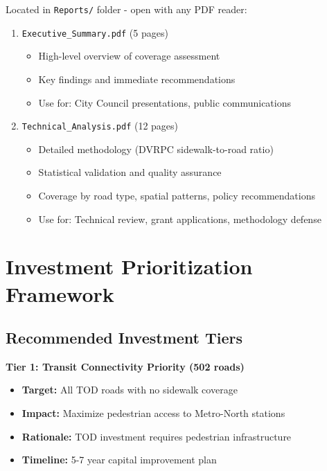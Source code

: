 \documentclass[11pt,letterpaper]{article}
\begin{document}
Located in \texttt{Reports/} folder - open with any PDF reader:

\begin{enumerate}[leftmargin=*]
    \item \texttt{Executive\_Summary.pdf} (5 pages)
    \begin{itemize}
        \item High-level overview of coverage assessment
        \item Key findings and immediate recommendations
        \item Use for: City Council presentations, public communications
    \end{itemize}

    \item \texttt{Technical\_Analysis.pdf} (12 pages)
    \begin{itemize}
        \item Detailed methodology (DVRPC sidewalk-to-road ratio)
        \item Statistical validation and quality assurance
        \item Coverage by road type, spatial patterns, policy recommendations
        \item Use for: Technical review, grant applications, methodology defense
    \end{itemize}
\end{enumerate}

\vspace{1em}

\section{Investment Prioritization Framework}

\subsection{Recommended Investment Tiers}

\textbf{Tier 1: Transit Connectivity Priority (502 roads)}
\begin{itemize}[leftmargin=*]
    \item \textbf{Target:} All TOD roads with no sidewalk coverage
    \item \textbf{Impact:} Maximize pedestrian access to Metro-North stations
    \item \textbf{Rationale:} TOD investment requires pedestrian infrastructure
    \item \textbf{Timeline:} 5-7 year capital improvement plan
\end{itemize}
\end{document}
